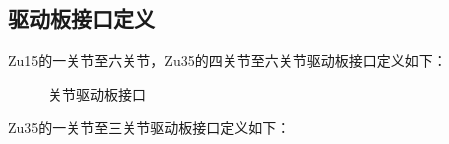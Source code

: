 \documentclass[a4paper,11pt,english,openany,oneside]{sphinxmanual}
\begin{document}
\subsection{驱动板接口定义}
\label{\detokenize{_u66f4_u6362_u5173_u8282:id11}}\label{\detokenize{_u66f4_u6362_u5173_u8282:id12}}
\sphinxAtStartPar
Zu15的一关节至六关节，Zu35的四关节至六关节驱动板接口定义如下：

\begin{figure}[H]
\centering
\capstart

\noindent{}
\caption{关节驱动板接口}\label{\detokenize{_u66f4_u6362_u5173_u8282:id26}}\end{figure}

\sphinxAtStartPar
Zu35的一关节至三关节驱动板接口定义如下：
\end{document}
